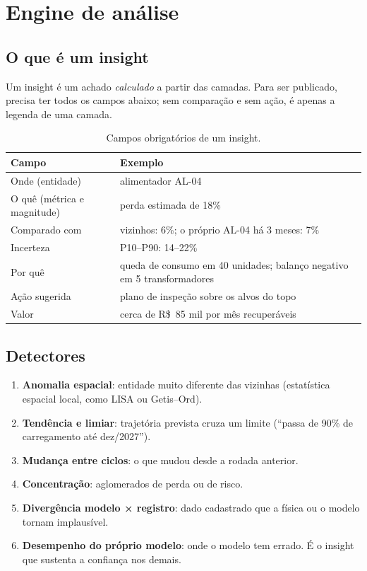 \documentclass[10pt,a4paper,oneside]{article}
\begin{document}
\section{Engine de análise}
\label{sec:engine}

\subsection{O que é um insight}

Um insight é um achado \emph{calculado} a partir das camadas. Para ser
publicado, precisa ter todos os campos abaixo; sem comparação e sem ação, é
apenas a legenda de uma camada.

\begin{table}[H]
\centering
\caption{Campos obrigatórios de um insight.}
\begin{tabularx}{\textwidth}{l L}
\toprule
\textbf{Campo} & \textbf{Exemplo} \\
\midrule
Onde (entidade) & alimentador AL-04 \\
O quê (métrica e magnitude) & perda estimada de 18\% \\
Comparado com & vizinhos: 6\%; o próprio AL-04 há 3 meses: 7\% \\
Incerteza & P10--P90: 14--22\% \\
Por quê & queda de consumo em 40 unidades; balanço negativo em 5
  transformadores \\
Ação sugerida & plano de inspeção sobre os alvos do topo \\
Valor & cerca de R\$~85 mil por mês recuperáveis \\
\bottomrule
\end{tabularx}
\end{table}

\subsection{Detectores}

\begin{enumerate}
  \item \textbf{Anomalia espacial}: entidade muito diferente das vizinhas
    (estatística espacial local, como LISA ou Getis--Ord).
  \item \textbf{Tendência e limiar}: trajetória prevista cruza um limite
    (``passa de 90\% de carregamento até dez/2027'').
  \item \textbf{Mudança entre ciclos}: o que mudou desde a rodada anterior.
  \item \textbf{Concentração}: aglomerados de perda ou de risco.
  \item \textbf{Divergência modelo × registro}: dado cadastrado que a física
    ou o modelo tornam implausível.
  \item \textbf{Desempenho do próprio modelo}: onde o modelo tem errado. É o
    insight que sustenta a confiança nos demais.
\end{enumerate}
\end{document}

